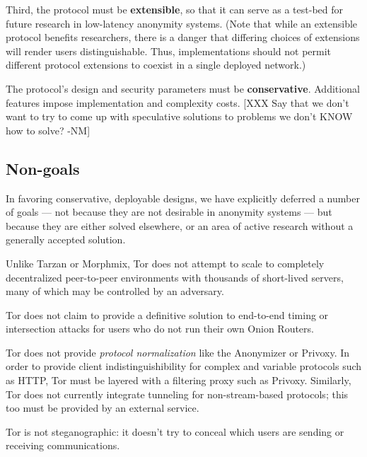 \documentclass[times,10pt,twocolumn]{article}
\begin{document}
Third, the protocol must be {\bf extensible}, so that it can serve as
a test-bed for future research in low-latency anonymity systems.
(Note that while an extensible protocol benefits researchers, there is
a danger that differing choices of extensions will render users
distinguishable.  Thus, implementations should not permit different
protocol extensions to coexist in a single deployed network.)


The protocol's design and security parameters must be {\bf
conservative}.  Additional features impose implementation and
complexity costs. [XXX Say that we don't want to try to come up with
speculative solutions to problems we don't KNOW how to solve? -NM]

\subsection{Non-goals}
In favoring conservative, deployable designs, we have explicitly
deferred a number of goals --- not because they are not desirable in
anonymity systems --- but because they are either solved
elsewhere, or an area of active research without a generally accepted
solution.

Unlike Tarzan or Morphmix, Tor does not attempt to scale to completely
decentralized peer-to-peer environments with thousands of short-lived
servers, many of which may be controlled by an adversary.

Tor does not claim to provide a definitive solution to end-to-end
timing or intersection attacks for users who do not run their own
Onion Routers.

Tor does not provide \emph{protocol normalization} like the Anonymizer or
Privoxy.  In order to provide client indistinguishibility for
complex and variable protocols such as HTTP, Tor must be layered with
a filtering proxy such as Privoxy.  Similarly, Tor does not currently
integrate tunneling for non-stream-based protocols; this too must be
provided by an external service.

Tor is not steganographic: it doesn't try to conceal which users are
sending or receiving communications.


\label{subsec:adversary-model}
\end{document}
